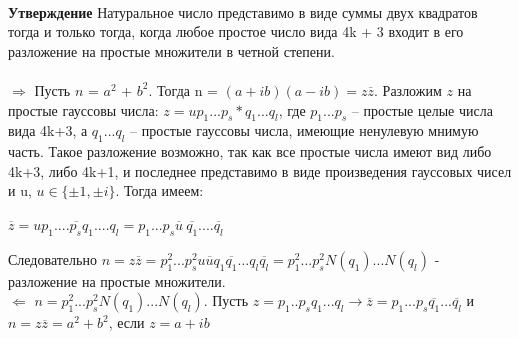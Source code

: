 \ \\\textbf{Утверждение} Натуральное число представимо в виде суммы двух квадратов тогда и только тогда, когда любое простое число вида 4k + 3 входит в его разложение на простые множители в четной степени.
\\
\Proof 
\\
$\Rightarrow$ Пусть $n$ = $a^2$ + $b^2$. Тогда n =  $(a + i b)(a - i b) = z\overline{z}$. Разложим $z$ на простые гауссовы числа: $z = up_1...p_s * q_1...q_l$, где $p_1...p_s$ -- простые целые числа вида 4k+3, а $q_1...q_l$ -- простые гауссовы числа, имеющие ненулевую мнимую часть. Такое разложение возможно, так как все простые числа имеют вид либо 4k+3, либо 4k+1, и последнее представимо в виде произведения гауссовых чисел и u, $u \in \{\pm 1, \pm i\}$. Тогда имеем:
\begin{center}
    $\overline{z} = \overline{up_1....p_sq_1....q_l} = p_1...p_s\overline{u}\ \overline{q_1}....\overline{q_l}$ 
\end{center}
Следовательно $n = z\overline{z} = p_1^2...p_s^2u \overline{u} q_1\overline{q_1}...q_l\overline{q_l} = p_1^2...p_s^2N(q_1)...N(q_l)$ - разложение на простые множители. \\
$\Leftarrow$ $n = p_1^2...p_s^2N(q_1)...N(q_l)$. Пусть $z = p_1..p_s q_1...q_l \longrightarrow \overline{z} = p_1...p_s \overline{q_1}...\overline{q_l}$ и $n = z\overline{z} = a^2 + b^2$, если $z = a+ i b$ \EndProof
